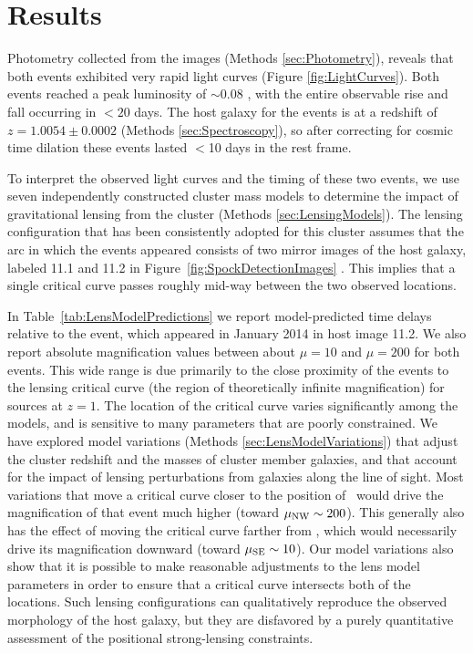 \section{Results}\label{sec:Results}

Photometry collected from the \HST images (Methods
\ref{sec:Photometry}), reveals that both \spock events exhibited very
rapid light curves (Figure \ref{fig:LightCurves}).  Both events
reached a peak luminosity of $\sim$0.08 \microjansky, with the entire
observable rise and fall occurring in $<20$ days.  The host galaxy for
the \spock events is at a redshift of $z=1.0054\pm0.0002$ (Methods
\ref{sec:Spectroscopy}), so after correcting for cosmic time dilation
these events lasted $<$10 days in the rest frame.

To interpret the observed light curves and the timing of these two
events, we use seven independently constructed cluster mass models to
determine the impact of gravitational lensing from the 
cluster (Methods \ref{sec:LensingModels}).  The lensing configuration
that has been consistently adopted for this cluster assumes that the
arc in which the \spock events appeared consists of two mirror images
of the host galaxy, labeled 11.1 and 11.2 in
Figure~\ref{fig:SpockDetectionImages} \citep{Zitrin:2013a,
  Jauzac:2014, Johnson:2014, Richard:2014, Diego:2015a, Grillo:2015,
  Hoag:2016, Sebesta:2016, Caminha:2017}.  This implies that a single
critical curve passes roughly mid-way between the two observed \spock
locations.

In Table~\ref{tab:LensModelPredictions} we report model-predicted time
delays relative to the \spockone event, which appeared in January 2014
in host image 11.2.  We also report absolute magnification values
between about $\mu=10$ and $\mu=200$ for both events. This wide range
is due primarily to the close proximity of the \spock events to the
lensing critical curve (the region of theoretically infinite
magnification) for sources at $z=1$.  The location of the critical
curve varies significantly among the models, and is sensitive to many
parameters that are poorly constrained.  We have explored model
variations (Methods \ref{sec:LensModelVariations}) that
adjust the cluster redshift and the masses of cluster member galaxies,
and that account for the impact of lensing perturbations from galaxies
along the line of sight.  Most variations that move a critical curve
closer to the position of \spockone\ would drive the magnification of
that event much higher (toward $\mu_{\rm NW}\sim200$).  This generally also
has the effect of moving the critical curve farther from \spocktwo,
which would necessarily drive its magnification downward (toward
$\mu_{\rm SE}\sim10$).  Our model variations also show that it is possible to
make reasonable adjustments to the lens model parameters in order to
ensure that a critical curve intersects both of the \spock locations.
Such lensing configurations can qualitatively reproduce the observed
morphology of the \spock host galaxy, but they are disfavored by a
purely quantitative assessment of the positional strong-lensing
constraints.

